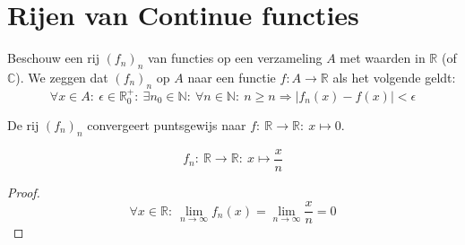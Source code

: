 \documentclass[main.tex]{subfiles}
\begin{document}
\section{Rijen van Continue functies}
\label{sec:rijen-van-Continue-functies}

\begin{de}
  Beschouw een rij $(f_{n})_{n}$ van functies op een verzameling $A$ met waarden in $\mathbb{R}$ (of $\mathbb{C}$).
  We zeggen dat $(f_{n})_{n}$  op $A$ naar een functie $f: A \rightarrow \mathbb{R}$ als het volgende geldt:
  \[ \forall x\in A:\ \epsilon \in \mathbb{R}_{0}^{+}:\ \exists n_{0}\in \mathbb{N}:\ \forall n\in \mathbb{N}:\ n \ge n \Rightarrow |f_{n}(x)-f(x)| < \epsilon \]
\end{de}

\begin{vb}
  De rij $(f_{n})_{n}$ convergeert puntsgewijs naar $f:\ \mathbb{R} \rightarrow \mathbb{R}:\ x \mapsto 0$.

  \noindent
  \begin{minipage}{.45\textwidth}
    \begin{figure}[H]
      \centering
    \end{figure}
  \end{minipage}
  \begin{minipage}{.45\textwidth}
    \[ f_{n}:\ \mathbb{R} \rightarrow \mathbb{R}:\ x \mapsto \frac{x}{n} \]
  \end{minipage}

  \begin{proof}
    \[ \forall x\in \mathbb{R}:\ \lim_{n \rightarrow \infty}f_{n}(x) = \lim_{n\rightarrow \infty}\frac{x}{n} = 0 \]
  \end{proof}
\end{vb}
\end{document}
